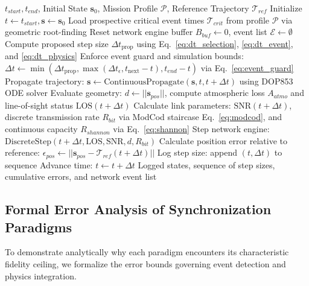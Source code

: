 \documentclass[a4paper,fleqn]{cas-sc}
\begin{document}
\begin{algorithm}
\caption{Adaptive Multi-Rate Co-Simulation Orchestrator}
\label{alg:orchestrator}
\begin{algorithmic}[1]
\REQUIRE $t_{start}, t_{end}$, Initial State $\mathbf{s}_0$, Mission Profile $\mathcal{P}$, Reference Trajectory $\mathcal{T}_{ref}$
\STATE Initialize $t \leftarrow t_{start}, \mathbf{s} \leftarrow \mathbf{s}_0$
\STATE \textcolor{revcolor}{Load prospective critical event times $\mathcal{T}_{crit}$ from profile $\mathcal{P}$} via geometric root-finding
\STATE Reset network engine buffer $B_{buf} \leftarrow 0$, event list $\mathcal{E} \leftarrow \emptyset$
    \STATE \textcolor{revcolor}{Compute proposed step size $\Delta t_{\text{prop}}$ using Eq.~\eqref{eq:dt_selection}}, \eqref{eq:dt_event}, and \eqref{eq:dt_physics}
    \STATE Enforce event guard and simulation bounds: $\Delta t \leftarrow \min\left(\Delta t_{\text{prop}}, \max(\Delta t_{\epsilon}, t_{\text{next}} - t), t_{end} - t\right)$ via Eq.~\eqref{eq:event_guard}
    \STATE Propagate trajectory: $\mathbf{s} \leftarrow \text{ContinuousPropagate}(\mathbf{s}, t, t + \Delta t)$ using DOP853 ODE solver
    \STATE Evaluate geometry: $d \leftarrow ||\mathbf{s}_{pos}||$, compute atmospheric loss $A_{atmo}$ and line-of-sight status $\text{LOS}(t+\Delta t)$
    \STATE Calculate link parameters: $\text{SNR}(t+\Delta t)$, discrete transmission rate $R_{bit}$ via ModCod staircase Eq.~\eqref{eq:modcod}, and continuous capacity $R_{shannon}$ via Eq.~\eqref{eq:shannon}
    \STATE Step network engine: $\text{DiscreteStep}(t+\Delta t, \text{LOS}, \text{SNR}, d, R_{bit})$
    \STATE Calculate position error relative to reference: $\epsilon_{pos} \leftarrow ||\mathbf{s}_{pos} - \mathcal{T}_{ref}(t+\Delta t)||$
    \STATE Log step size: append $(t, \Delta t)$ to sequence
    \STATE Advance time: $t \leftarrow t + \Delta t$
\ENDWHILE
\RETURN Logged states, sequence of step sizes, cumulative errors, and network event list
\end{algorithmic}
\end{algorithm}



\subsection{Formal Error Analysis of Synchronization Paradigms}
To demonstrate analytically why each paradigm encounters its characteristic fidelity ceiling, we formalize the error bounds governing event detection and physics integration.
\end{document}

